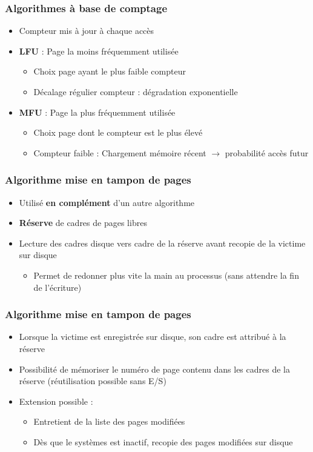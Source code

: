 \begin{frame}
\frametitle{Algorithmes à base de comptage}
\begin{itemize}
\item Compteur mis à jour à chaque accès
\item \textbf{LFU} : Page la moins fréquemment utilisée
\begin{itemize}
\item Choix page ayant le plus faible compteur
\item Décalage régulier compteur : dégradation exponentielle
\end{itemize}
\item \textbf{MFU} : Page la plus fréquemment utilisée
\begin{itemize}
\item Choix page dont le compteur est le plus élevé
\item Compteur faible : Chargement mémoire récent $\rightarrow$ probabilité accès futur
\end{itemize}
\end{itemize}
\end{frame}


\begin{frame}
\frametitle{Algorithme mise en tampon de pages}
\begin{itemize}
\item Utilisé \textbf{en complément} d'un autre algorithme
\item \textbf{Réserve} de cadres de pages libres
\item Lecture des cadres disque vers cadre de la réserve avant recopie de la victime sur disque
\begin{itemize}
\item Permet de redonner plus vite la main au processus (sans attendre la fin de l'écriture)
\end{itemize}
\end{itemize}
\end{frame}


\begin{frame}
\frametitle{Algorithme mise en tampon de pages}
\begin{itemize}
\item Lorsque la victime est enregistrée sur disque, son cadre est attribué à la réserve
\item Possibilité de mémoriser le numéro de page contenu dans les cadres de la réserve (réutilisation possible sans E/S)
\item Extension possible :
\begin{itemize}
\item Entretient de la liste des pages modifiées
\item Dès que le systèmes est inactif, recopie des pages modifiées sur disque
\end{itemize}
\end{itemize}
\end{frame}


